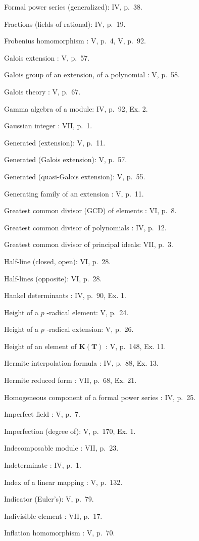 Formal power series (generalized): IV, p.~38.

Fractions (fields of rational): IV, p.~19.

Frobenius homomorphism : V, p.~4, V, p.~92.

Galois extension : V, p.~57.

Galois group of an extension, of a polynomial : V, p.~58.

Galois theory : V, p.~67.

Gamma algebra of a module: IV, p.~92, Ex. 2.

Gaussian integer : VII, p.~1.

Generated (extension): V, p.~11.

Generated (Galois extension): V, p.~57.

Generated (quasi-Galois extension): V, p.~55.

Generating family of an extension : V, p.~11.

Greatest common divisor (GCD) of elements : VI, p.~8.

Greatest common divisor of polynomials : IV, p.~12.

Greatest common divisor of principal ideals: VII, p.~3.

Half-line (closed, open): VI, p.~28.

Half-lines (opposite): VI, p.~28.

Hankel determinants : IV, p.~90, Ex. 1.

Height of a \(p\) -radical element: V, p.~24.

Height of a \(p\) -radical extension: V, p.~26.

Height of an element of \(\mathbf{K}(\mathbf{T})\) : V, p.~148, Ex. 11.

Hermite interpolation formula : IV, p.~88, Ex. 13.

Hermite reduced form : VII, p.~68, Ex. 21.

Homogeneous component of a formal power series : IV, p.~25.

Imperfect field : V, p.~7.

Imperfection (degree of): V, p.~170, Ex. 1.

Indecomposable module : VII, p.~23.

Indeterminate : IV, p.~1.

Index of a linear mapping : V, p.~132.

Indicator (Euler's): V, p.~79.

Indivisible element : VII, p.~17.

Inflation homomorphism : V, p.~70.


